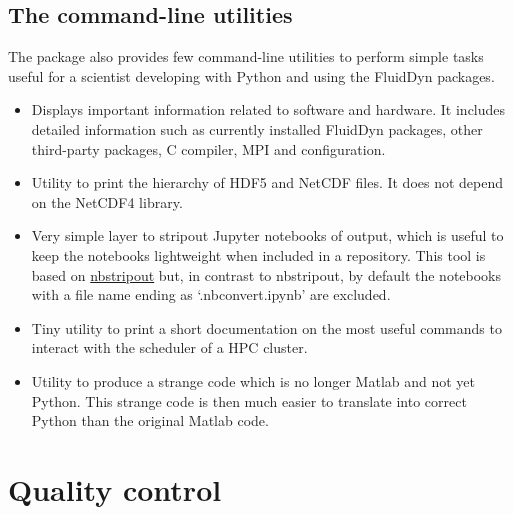 \documentclass{../jors}
\begin{document}
\subsection*{The \fluiddyn command-line utilities}

The package \fluiddyn also provides few command-line utilities to perform
simple tasks useful for a scientist developing with Python and using the
FluidDyn packages.
\begin{itemize}

\item {}

Displays important information related to software and hardware. It
includes detailed information such as currently installed FluidDyn packages,
other third-party packages, C compiler, MPI and \Numpy configuration.

\item {}

Utility to print the hierarchy of HDF5 and NetCDF files. It does not depend on
the NetCDF4 library.

\item {}

Very simple layer to stripout Jupyter notebooks of output, which is useful to
keep the notebooks lightweight when included in a repository.
%
This tool is based on \href{https://github.com/kynan/nbstripout}{nbstripout}
but, in contrast to nbstripout,
%
by default the notebooks with a file name ending as `.nbconvert.ipynb' are
excluded.

\item {}

Tiny utility to print a short documentation on the most useful commands to
interact with the scheduler of a HPC cluster.

\item {}

Utility to produce a strange code which is no longer Matlab and not yet Python.
%
This strange code is then much easier to translate into correct Python than the
original Matlab code.

\end{itemize}


\section*{Quality control}

\end{document}
